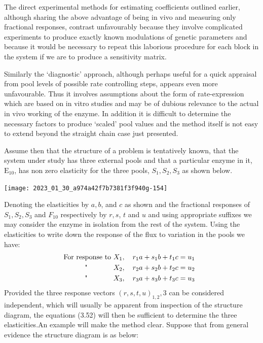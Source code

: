 The direct experimental methods for estimating coefficients outlined earlier, although sharing the above advantage of being in vivo and measuring only fractional responses, contrast unfavourably because they involve complicated experiments to produce exactly known modulations of genetic parameters and because it would be necessary to repeat this laborious procedure for each block in the system if we are to produce a sensitivity matrix.

Similarly the `diagnostic' approach, although perhaps useful for a quick appraisal from pool levels of possible rate controlling steps, appears even more unfavourable. Thus it involves assumptions about the form of rate-expression which are based on in vitro studies and may be of dubious relevance to the actual in vivo working of the enzyme. In addition it is difficult to determine the necessary factors to produce `scaled' pool values and the method itself is not easy to extend beyond the straight chain case just presented.

Assume then that the structure of a problem is tentatively known, that the system under study has three external pools and that a particular enzyme in it, $\mathrm{E}_{10}$, has non zero elasticity for the three pools, $S_{1}, S_{2}, S_{3}$ as shown below.

\centerline{\texttt{[image: 2023\_01\_30\_a974a42f7b7381f3f940g-154]}}


Denoting the elasticities by $a, b$, and $c$ as shown and the fractional responses of $S_{1}, S_{2}, S_{3}$ and $F_{10}$ respectively by $r, s$, $t$ and $u$ and using appropriate suffixes we may consider the enzyme in isolation from the rest of the system. Using the elasticities to write down the response of the flux to variation in the pools we have:
%
\begin{equation}
\begin{aligned}
\text {For response to } & X_{1}, \quad r_{1} a + s_{1} b + t_{1} c = u_{1} \\
\text {\phantom{XXXX} " \phantom{XXXX} } & X_{2}, \quad r_{2}a + s_{2} b + t_{2} c = u_{2} \quad \\
\text {\phantom{XXXX} " \phantom{XXXX} } & X_{3}, \quad r_{3}a + s_{3}b + t_{3} c = u_{3}
\end{aligned}
\label{eqn:352}
\end{equation}
%
Provided the three response vectors $(r, s, t, u)_{1,2}, 3$ can be considered independent, which will usually be apparent from inspection of the structure diagram, the equations (3.52) will then be sufficient to determine the three elasticities.An example will make the method clear. Suppose that from general evidence the structure diagram is as below:

